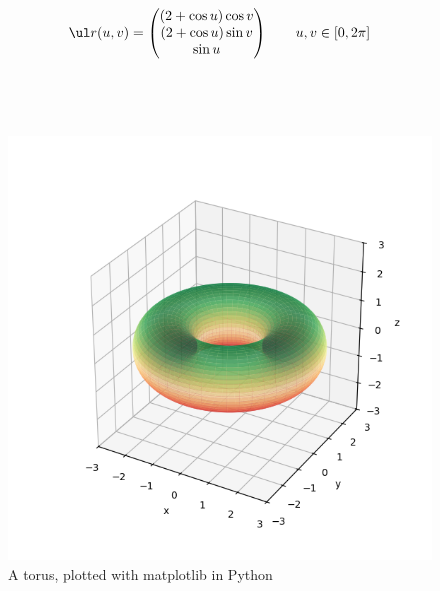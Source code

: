 \documentclass[a4paper]{article}
\begin{document}


$$\ul r(u, v) = \begin{pmatrix} (2 + \cos u) \cos v \\ (2 + \cos u) \sin v \\ \sin u \end{pmatrix} \qquad u, v \in [0, 2\pi]$$

\subsection{~}

\begin{figure}[h]
	\centering
	\includegraphics[scale=0.8]{Q3a-torus}
	\caption{A torus, plotted with matplotlib in Python}
	\label{fig:torus-plot}
\end{figure}
\end{document}
